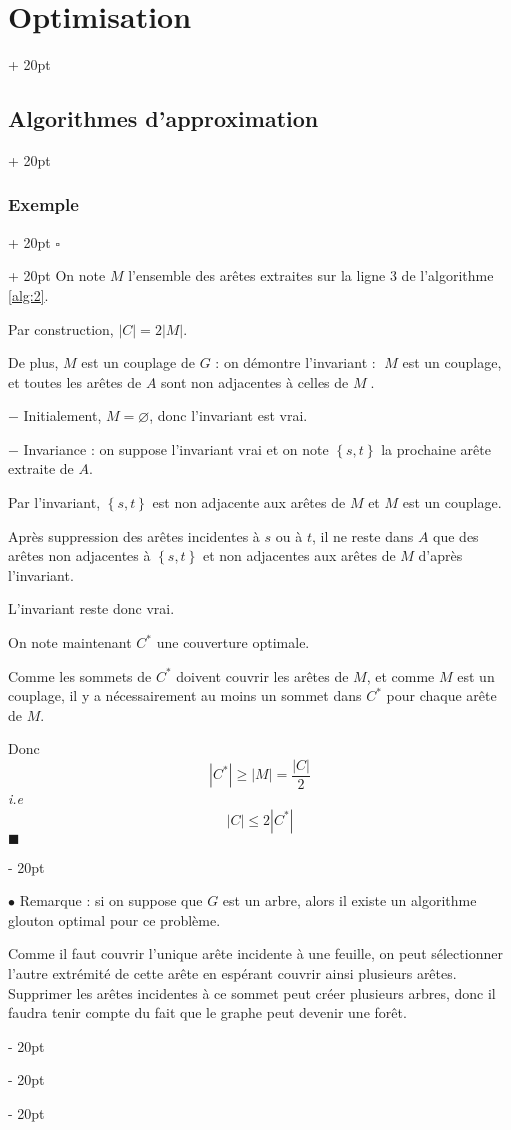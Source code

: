\documentclass[a4paper, 12pt, twoside]{article}
\newcommand{\set}[1]{\left\{ #1 \right\}}
\newcommand{\abs}[1]{\left\lvert #1 \right\rvert}
\renewcommand{\le}{\leqslant}
\renewcommand{\ge}{\geqslant}
\newcommand{\simplecit}[1]{\guillemotleft$\;$#1$\;$\guillemotright}
\newcommand{\ind}[1][20pt]{\advance\leftskip + #1}
\newcommand{\deind}[1][20pt]{\advance\leftskip - #1}
\newenvironment{indt}[2][20pt]{#2 \par \ind[#1]}{\par \deind} %
\newenvironment{proof}[1][{}]{\begin{indt}{$\square$ #1}}{$\blacksquare$ \end{indt}}
\newcommand{\1}{\mathbbm 1}
\begin{document}
\begin{indt}{\section{Optimisation}}
\begin{indt}{\subsection{Algorithmes d'approximation}}
\begin{indt}{\subsubsection{Exemple}}
\begin{proof}
                    On note $M$ l'ensemble des arêtes extraites sur la ligne 3 de l'algorithme \ref{alg:2}.

                    Par construction, $\abs C = 2 \abs M$.

                    De plus, $M$ est un couplage de $G$ : on démontre l'invariant : \simplecit{$M$ est un couplage, et toutes les arêtes de $A$ sont non adjacentes à celles de $M$}.

                    $-$ Initialement, $M = \varnothing$, donc l'invariant est vrai.

                    $-$ Invariance : on suppose l'invariant vrai et on note $\set{s, t}$ la prochaine arête extraite de $A$.

                    Par l'invariant, $\set{s, t}$ est non adjacente aux arêtes de $M$ et $M$ est un couplage.

                    Après suppression des arêtes incidentes à $s$ ou à $t$, il ne reste dans $A$ que des arêtes non adjacentes à $\set{s, t}$ et non adjacentes aux arêtes de $M$ d'après l'invariant.

                    L'invariant reste donc vrai.

                    \vspace{12pt}
                    
                    On note maintenant $C^*$ une couverture optimale.

                    Comme les sommets de $C^*$ doivent couvrir les arêtes de $M$, et comme $M$ est un couplage, il y a nécessairement au moins un sommet dans $C^*$ pour chaque arête de $M$.

                    Donc
                    \[
                        \abs{C^*} \ge \abs M = \dfrac{\abs C}{2}
                    \]
                    \textit{i.e}
                    \[
                        \abs C \le 2 \abs{C^*}
                    \]
                \end{proof}

                \vspace{12pt}
                
                $\bullet$ Remarque :
                si on suppose que $G$ est un arbre, alors il existe un algorithme glouton optimal pour ce problème.

                Comme il faut couvrir l'unique arête incidente à une feuille, on peut sélectionner l'autre extrémité de cette arête en espérant couvrir ainsi plusieurs arêtes.
                Supprimer les arêtes incidentes à ce sommet peut créer plusieurs arbres, donc il faudra tenir compte du fait que le graphe peut devenir une forêt.


\end{indt}
\end{indt}
\end{indt}
\end{document}
